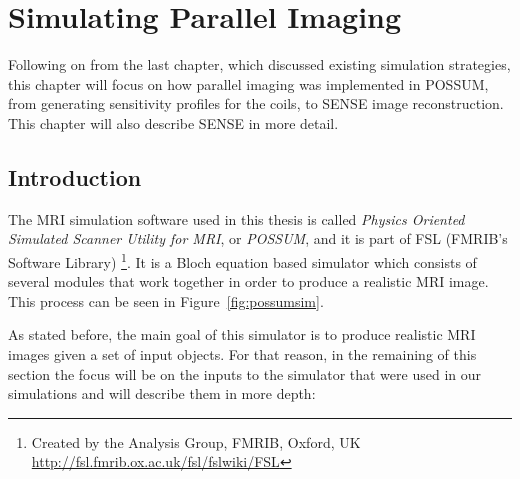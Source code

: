 \chapter{Simulating Parallel Imaging}
\label{chapterlabel4}

Following on from the last chapter, which discussed existing simulation strategies, this chapter will focus on how parallel imaging was implemented in POSSUM, from generating sensitivity profiles for the coils, to SENSE image reconstruction. This chapter will also describe SENSE in more detail.

\section{Introduction}
The MRI simulation software used in this thesis is called \textit{Physics Oriented Simulated Scanner Utility for MRI}, or \textit{POSSUM}, and it is part of FSL (FMRIB's Software Library) \footnote{Created by the Analysis Group, FMRIB, Oxford, UK  \url{http://fsl.fmrib.ox.ac.uk/fsl/fslwiki/FSL}}. It is a Bloch equation based simulator which consists of several modules that work together in order to produce a realistic MRI image. This process can be seen in Figure~\ref{fig:possumsim}.  

As stated before, the main goal of this simulator is to produce realistic MRI images given a set of input objects. For that reason, in the remaining of this section the focus will be on the inputs to the simulator that were used in our simulations and will describe them in more depth: 

